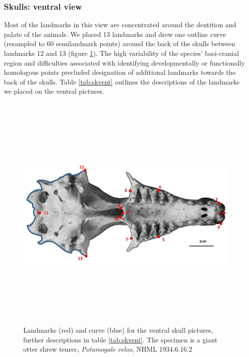 \documentclass[12pt,a4paper]{article}
\begin{document}
\subsubsection{Skulls: ventral view}
Most of the landmarks in this view are concentrated around the dentition and palate of the animals. We placed 13 landmarks and drew one outline curve (resampled to 60 semilandmark points) around the back of the skulls between landmarks 12 and 13 (figure \ref{fig:skvent_landmarks}). The high variability of the species’ basi-cranial region and difficulties associated with identifying developmentally or functionally homologous points precluded designation of additional landmarks towards the back of the skulls. Table \ref{tab:skvent} outlines the descriptions of the landmarks we placed on the ventral pictures.


\begin{figure}[H] 
  \centering
  \includegraphics[width=12cm, height=12cm, keepaspectratio=true]
  {figures/skvent_landmarks_pot_vel.jpg}
    \caption {Landmarks (red) and curve (blue) for the ventral skull pictures, further descriptions in table \ref{tab:skvent}. The specimen is a giant otter shrew tenrec, \textit{Potamogale velox}, NHML 1934.6.16.2}
  \label{fig:skvent_landmarks}
  \end{figure}


\begin{table}[h]
\caption{Descriptions of the landmarks (points) and curves (semilandmarks) for the skulls in ventral view (see Figure \ref{fig:skvent_landmarks}.} 

\label{tab:skvent}
\end{table}
\end{document}
